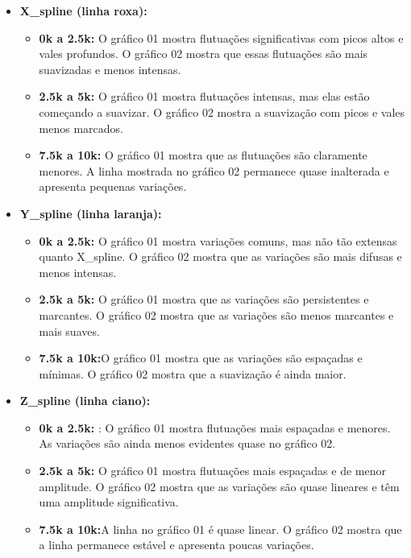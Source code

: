 \documentclass[12pt, a4paper]{article}
\begin{document}
\begin{itemize}
    \item \textbf{X\_spline (linha roxa):}
          \begin{itemize}
              \item \textbf{0k a 2.5k: }O gráfico 01 mostra flutuações significativas com picos altos e vales profundos. O gráfico 02 mostra que essas flutuações são mais suavizadas e menos intensas.
              \item \textbf{2.5k a 5k: }O gráfico 01 mostra flutuações intensas, mas elas estão começando a suavizar. O gráfico 02 mostra a suavização com picos e vales menos marcados.
              \item \textbf{7.5k a 10k:} O gráfico 01 mostra que as flutuações são claramente menores. A linha mostrada no gráfico 02 permanece quase inalterada e apresenta pequenas variações.
          \end{itemize}
    \item \textbf{Y\_spline (linha laranja):}
          \begin{itemize}
              \item \textbf{0k a 2.5k: }O gráfico 01 mostra variações comuns, mas não tão extensas quanto X\_spline. O gráfico 02 mostra que as variações são mais difusas e menos intensas.
              \item \textbf{2.5k a 5k: }O gráfico 01 mostra que as variações são persistentes e marcantes. O gráfico 02 mostra que as variações são menos marcantes e mais suaves.
              \item \textbf{7.5k a 10k:}O gráfico 01 mostra que as variações são espaçadas e mínimas. O gráfico 02 mostra que a suavização é ainda maior.
          \end{itemize}
    \item \textbf{Z\_spline (linha ciano):}
          \begin{itemize}
              \item \textbf{0k a 2.5k: }: O gráfico 01 mostra flutuações mais espaçadas e menores. As variações são ainda menos evidentes quase no gráfico 02. 
              \item \textbf{2.5k a 5k: } O gráfico 01 mostra flutuações mais espaçadas e de menor amplitude. O gráfico 02 mostra que as variações são quase lineares e têm uma amplitude significativa. 
              \item \textbf{7.5k a 10k:}A linha no gráfico 01 é quase linear. O gráfico 02 mostra que a linha permanece estável e apresenta poucas variações.
          \end{itemize}
\end{itemize}
\end{document}
